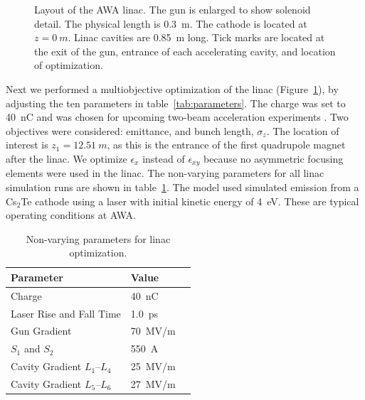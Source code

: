 \documentclass{iitthesis}
\begin{document}
\begin{figure}
\begin{center}
	\end{center}
	\caption{Layout of the AWA linac.
		The gun is enlarged to show solenoid detail. The physical length is
		\SI{0.3}{m}. The cathode is located at $z=\SI{0}{m}$. Linac cavities are
		\SI{0.85}{m} long. Tick marks are located at the exit of the gun, entrance of
		each accelerating cavity, and location of optimization.}
	\label{fig:beamline} 
\end{figure} 

Next we performed a multiobjective optimization of the linac (Figure~\ref{fig:beamline}), 
by adjusting the ten parameters in table~\ref{tab:parameters}. The charge was set to \SI{40}{nC}
and was chosen for upcoming two-beam acceleration experiments \cite{Jing:2015bxl}. 
Two objectives were considered: emittance, and bunch length, $\sigma_z$. 
The location of interest is $z_1=\SI{12.51}{m}$, as this is the entrance of the first 
quadrupole magnet after the linac. We optimize $\epsilon_x$ instead of $\epsilon_{xy}$ because 
no asymmetric focusing elements were used in the linac. 
The non-varying parameters for all linac simulation runs are shown in table~\ref{tab:linac}.
The model used simulated emission
from a Cs$_2$Te cathode using a laser with initial kinetic energy of \SI{4}{eV}. 
These are typical operating conditions at AWA. 
\begin{table}[h] %
	\caption{\label{tab:linac} Non-varying parameters for linac optimization.}
	\begin{center}
		\begin{tabular}{lll}
			\textbf{Parameter} & \textbf{Value} \\
			\midrule
			Charge  & \SI{40}{nC} \\
			Laser Rise and Fall Time & \SI{1.0}{ps} \\
			Gun Gradient & \SI{70}{MV/m} \\
			$S_1$ and $S_2$ & \SI{550}{A}\\
			Cavity Gradient $L_1$--$L_4$ & \SI{25}{MV/m} \\
			Cavity Gradient $L_5$--$L_6$ & \SI{27}{MV/m} \\
			\bottomrule
		\end{tabular}
	\end{center}
\end{table}
\end{document}
